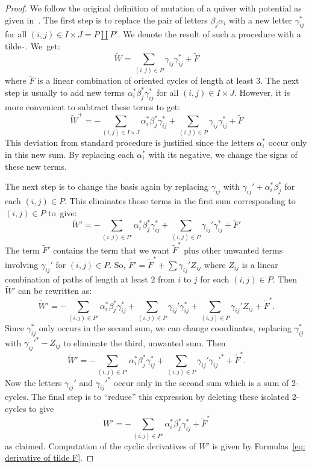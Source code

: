 \documentclass[ALCO,ThmDefs,Unicode,epreuves]{cedram}
\begin{document}
\begin{proof}
We follow the original definition of mutation of a quiver with potential as given in~\cite{DWZ1}. The first step is to replace the pair of letters $\beta_j\alpha_i$ with a new letter $\gamma_{ij}^\ast$ for all $(i,j)\in I\times J=P\coprod P'$. We denote the result of such a procedure with a tilde $\widetilde\,$. We~get:
\[
	\widetilde W= \sum_{(i,j)\in P} \gamma_{ij}\gamma_{ij}^\ast + \widetilde F
\]
where $\widetilde F$ is a linear combination of oriented cycles of length at least 3. The next step is usually to add new terms $\alpha_i^\ast\beta_j^\ast\gamma_{ij}^\ast$ for all $(i,j)\in I\times J$. However, it is more convenient to subtract these terms to get:
\[
	\widetilde W^+=-\sum_{(i,j)\in I\times J} \alpha_i^\ast\beta_j^\ast\gamma_{ij}^\ast+ \sum_{(i,j)\in P} \gamma_{ij}\gamma_{ij}^\ast + \widetilde F
\]
This deviation from standard procedure is justified since the letters $\alpha_i^\ast$ occur only in this new sum. By replacing each $\alpha_i^\ast$ with its negative, we change the signs of these new terms.

The next step is to change the basis again by replacing $\gamma_{ij}$ with $\gamma_{ij}'+\alpha_i^\ast\beta_j^\ast$ for each $(i,j)\in P$. This eliminates those terms in the first sum corresponding to $(i,j)\in P$ to~give:
\[
	\widetilde W'=-\sum_{(i,j)\in P'} \alpha_i^\ast\beta_j^\ast\gamma_{ij}^\ast+ \sum_{(i,j)\in P} \gamma_{ij}'\gamma_{ij}^\ast + \widetilde F'
\]
The term $\widetilde F'$ contains the term that we want $\widetilde F^\ast$ plus other unwanted terms involving $\gamma_{ij}'$ for $(i,j)\in P$. So, $\widetilde F'=\widetilde F^\ast+\sum \gamma_{ij}'Z_{ij}$ where $Z_{ij}$ is a linear combination of paths of length at least 2 from $i$ to $j$ for each $(i,j)\in P$. Then $\widetilde W'$ can be rewritten as:
\[
	\widetilde W'=-\sum_{(i,j)\in P'} \alpha_i^\ast\beta_j^\ast\gamma_{ij}^\ast+ \sum_{(i,j)\in P} \gamma_{ij}'\gamma_{ij}^\ast+\sum_{(i,j)\in P} \gamma_{ij}'Z_{ij} + \widetilde F^\ast.
\]
Since $\gamma_{ij}^\ast$ only occurs in the second sum, we can change coordinates, replacing $\gamma_{ij}^\ast$ with $\gamma_{ij}'^{\ast}-Z_{ij}$ to eliminate the third, unwanted sum. Then
\[
	\widetilde W'=-\sum_{(i,j)\in P'} \alpha_i^\ast\beta_j^\ast\gamma_{ij}^\ast+ \sum_{(i,j)\in P} \gamma_{ij}'\gamma_{ij}'^\ast+ \widetilde F^\ast.
\]
Now the letters $\gamma_{ij}'$ and $\gamma_{ij}'^\ast$ occur only in the second sum which is a sum of 2-cycles. The final step is to ``reduce'' this expression by deleting these isolated 2-cycles to give
\[
	 W'=-\sum_{(i,j)\in P'} \alpha_i^\ast\beta_j^\ast\gamma_{ij}^\ast+  \widetilde F^\ast
\]
as claimed. Computation of the cyclic derivatives of $W'$ is given by Formulas~\ref{eq: derivative of tilde F}.
\end{proof}
\end{document}
